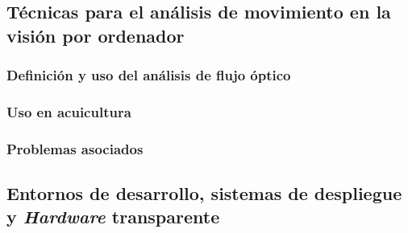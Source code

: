 \subsection{Técnicas para el análisis  de movimiento en la visión por ordenador}

\subsubsection{Definición y uso del análisis de flujo óptico}

\subsubsection{Uso en acuicultura}

\subsubsection{Problemas asociados}

\subsection{Entornos de desarrollo, sistemas de despliegue y \textit{Hardware} transparente}